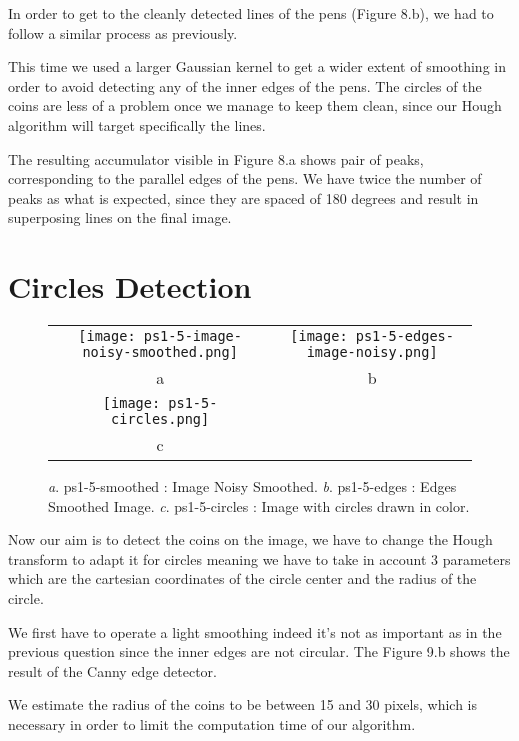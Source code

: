 \documentclass[a4paper,11pt]{article}
\begin{document}
In order to get to the cleanly detected lines of the pens (Figure 8.b), we had to follow a similar process as previously.

This time we used a larger Gaussian kernel to get a wider extent of smoothing in order to avoid detecting any of the inner edges of the pens. The circles of the coins are less of a problem once we manage to keep them clean, since our Hough algorithm will target specifically the lines.

The resulting accumulator visible in Figure 8.a shows pair of peaks, corresponding to the parallel edges of the pens. We have twice the number of peaks as what is expected, since they are spaced of 180 degrees and result in superposing lines on the final image.

\section{Circles Detection}

 \begin{figure}[H]
\begin{center}
\begin{tabular}{cc}
\texttt{[image: ps1-5-image-noisy-smoothed.png]}&
\texttt{[image: ps1-5-edges-image-noisy.png]}\\
	a&b\\
\texttt{[image: ps1-5-circles.png]}\\
c
\end{tabular}
\end{center}
 \caption{
\textit{a}. ps1-5-smoothed : Image Noisy Smoothed.  \textit{b}. ps1-5-edges : Edges Smoothed Image.
\textit{c}. ps1-5-circles : Image with circles drawn in color. }
\label{ps1-5}
\end{figure}

Now our aim is to detect the coins on the image, we have to change the Hough transform to adapt it for circles meaning we have to take in account 3 parameters which are the cartesian coordinates of the circle center and the radius of the circle.

We first have to operate a light smoothing indeed it's not as important as in the previous question since the inner edges are not circular.
The Figure 9.b shows the result of the Canny edge detector.

We estimate the radius of the coins to be between 15 and 30 pixels, which is necessary in order to limit the computation time of our algorithm. 
\end{document}
